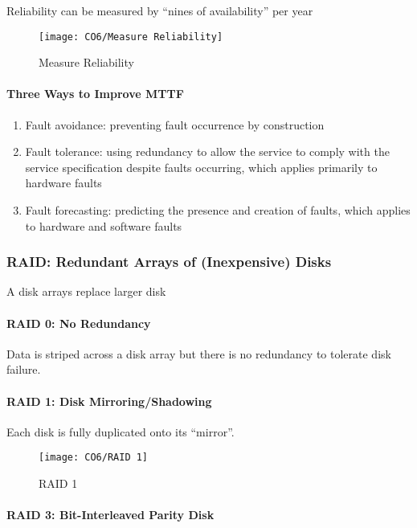 Reliability can be measured by ``nines of availability'' per year
\begin{figure}[!htb]
    \centering
    \texttt{[image: CO6/Measure Reliability]}
    \caption{Measure Reliability}
\end{figure}

\paragraph{Three Ways to Improve MTTF}
\begin{enumerate}\small
    \item Fault avoidance:
    preventing fault occurrence by construction
    \item Fault tolerance:
    using redundancy to allow the service to comply with the
    service specification despite faults occurring, which applies
    primarily to hardware faults
    \item Fault forecasting:
    predicting the presence and creation of faults, which applies
    to hardware and software faults
\end{enumerate}

\subsubsection{RAID: Redundant Arrays of (Inexpensive) Disks}
A disk arrays replace larger disk

\paragraph{RAID 0: No Redundancy}
Data is striped across a disk array but there is no redundancy to tolerate disk failure.

\paragraph{RAID 1: Disk Mirroring/Shadowing}
Each disk is fully duplicated onto its ``mirror''. 

\begin{figure}[!htb]
    \centering
    \texttt{[image: CO6/RAID 1]}
    \caption{RAID 1}
\end{figure}

\paragraph{RAID 3: Bit-Interleaved Parity Disk}


